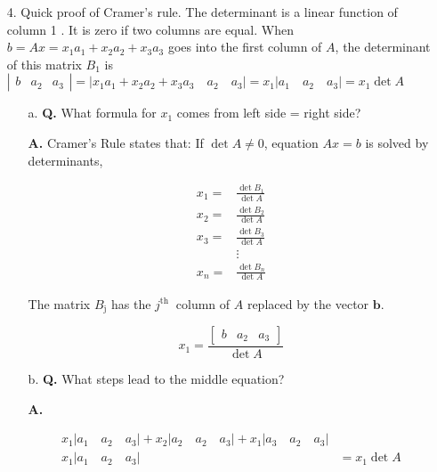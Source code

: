 \documentclass[main.tex]{subfiles}
\begin{document}
\begin{enumerate}
\begin{enumerate}
    \end{enumerate}
    
    \item [4.] Quick proof of Cramer's rule. The determinant is a linear function of column 1 . It is zero if two columns are equal. When $b=A x=x_{1} a_{1}+x_{2} a_{2}+x_{3} a_{3}$ goes into the first column of $A$, the determinant of this matrix $B_{1}$ is $\left|\begin{array}{lll}b & a_{2} & a_{3}\end{array}\right|=\left|x_{1} a_{1}+x_{2} a_{2}+x_{3} a_{3} \quad a_{2} \quad a_{3}\right|=x_{1}\left|a_{1} \quad a_{2} \quad a_{3}\right|=x_{1} \operatorname{det} A$
    \begin{enumerate}
        \item [a.] \textbf{Q.} What formula for $x_{1}$ comes from left side = right side? 
        
        \textbf{A.} Cramer's Rule states that: If $\operatorname{det} A \neq 0$, equation $A x=b$ is solved by determinants,
        
        $$
        \begin{aligned}
        x_{1}=& \frac{\operatorname{det} B_{1}}{\operatorname{det} A} \\
        x_{2}=& \frac{\operatorname{det} B_{2}}{\operatorname{det} A} \\
        x_{3}=& \frac{\operatorname{det} B_{3}}{\operatorname{det} A} \\
        & \vdots \\
        x_{n}=& \frac{\operatorname{det} B_{n}}{\operatorname{det} A}
        \end{aligned}
        $$
        
        The matrix $B_{\mathrm{j}}$ has the $j^{\text {th }}$ column of $A$ replaced by the vector $\boldsymbol{b}$.
        
        $$
        x_{1}=\frac{\left[\begin{array}{lll}
        b & a_{2} & a_{3}
        \end{array}\right]}{\operatorname{det} A}
        $$
        
        \item [b.] \textbf{Q.} What steps lead to the middle equation? 
        
        \textbf{A.}
        
        $$
        \begin{aligned}
        x_{1}\left|a_{1} \quad a_{2} \quad a_{3}\right|+x_{2}\left|a_{2} \quad a_{2} \quad a_{3}\right|+x_{1}\left|a_{3} \quad a_{2} \quad a_{3}\right| &\\
        x_{1}\left|a_{1} \quad a_{2} \quad a_{3}\right| &= x_{1} \operatorname{det} A
        \end{aligned}
        $$
    

\end{enumerate}
\end{enumerate}
\end{document}
